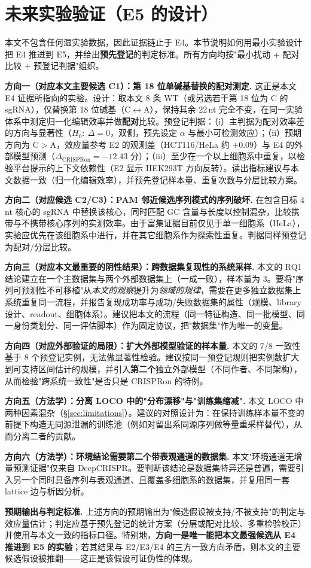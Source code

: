 \section{未来实验验证（E5 的设计）}
\label{sec:future}

本文不包含任何湿实验数据，因此证据链止于 E4。本节说明如何用最小实验设计把 E4 推进到 E5，并给出\textbf{预先登记}的判定标准。所有方向均按"最小扰动 + 配对比较 + 预登记判据"组织。

\textbf{方向一（对应本文主要候选 C1）：第 18 位单碱基替换的配对测定.} 这正是本文 E4 证据所指向的实验。设计：取本文 8 条 WT（或另选若干第 18 位为 C 的 sgRNA），仅替换第 18 位碱基（C$\leftrightarrow$A），保持其余 22\,nt 完全不变，在同一实验体系中测定归一化编辑效率并做\textbf{配对}比较。预登记判据：（i）主判据为配对效率差的方向与显著性（$H_0:\ \Delta=0$，双侧，预先设定 $\alpha$ 与最小可检测效应）；（ii）预期方向为 C$>$A，效应量参考 E2 的观测差（HCT116/HeLa 约 $+0.09$）与 E4 的外部模型预测（$\Delta_{\text{CRISPRon}}=-12.43$ 分）；（iii）至少在一个以上细胞系中重复，以检验平台提示的上下文依赖性（E2 显示 HEK293T 方向反转）。读出指标建议与本文数据一致（归一化编辑效率），并预先登记样本量、重复次数与分层比较方案。

\textbf{方向二（对应候选 C2/C3）：PAM 邻近候选序列模式的序列破坏.} 在包含目标 4\,nt 核心的 sgRNA 中替换该核心，同时匹配 GC 含量与长度以控制混杂，比较携带与不携带核心序列的实测效率。由于富集证据目前仅见于单一细胞系（HeLa），实验应优先在该细胞系中进行，并在其它细胞系作为探索性重复。判据同样预登记为配对/分层比较。

\textbf{方向三（对应本文最重要的阴性结果）：跨数据集复现性的系统采样.} 本文的 RQ1 结论建立在一个主数据集与两个外部数据集上（一成一败），样本量为 3。要将"序列可预测性不可移植"从\emph{本文的观察}提升为\emph{领域的规律}，需要在更多独立数据集上系统重复同一流程，并报告复现成功率与成功/失败数据集的属性（规模、library 设计、readout、细胞体系）。建议把本文的流程（同一特征构造、同一批模型、同一身份类划分、同一评估脚本）作为固定协议，把"数据集"作为唯一的变量。

\textbf{方向四（对应外部验证的局限）：扩大外部模型验证的样本量.} 本文的 7/8 一致性基于 8 个预登记实例，无法做显著性检验。建议按同一预登记规则把实例数扩大到可支持区间估计的规模，并引入\textbf{第二个}独立外部模型（不同作者、不同架构），从而检验"跨系统一致性"是否只是 CRISPRon 的特例。

\textbf{方向五（方法学）：分离 LOCO 中的"分布漂移"与"训练集缩减".} 本文 LOCO 中两种因素混杂（\S\ref{sec:limitations}）。建议的对照设计为：在保持训练样本量不变的前提下构造无同源泄漏的训练池（例如对留出系同源序列做等量重采样替代），从而分离二者的贡献。

\textbf{方向六（方法学）：环境结论需要第二个带表观通道的数据集.} 本文"环境通道无增量预测证据"仅来自 DeepCRISPR。要判断该结论是数据集特异还是普遍，需要引入另一个同时具备序列与表观通道、且覆盖多细胞系的数据集，并复用同一套 lattice 边与析因分析。

\textbf{预期输出与判定标准.} 上述方向的预期输出为"候选假设被支持/不被支持"的判定与效应量估计；判定应基于预先登记的统计方案（分层或配对比较、多重检验校正）并使用与本文一致的指标口径。特别地，\textbf{方向一是唯一能把本文最强候选从 E4 推进到 E5 的实验}；若其结果与 E2/E3/E4 的三方一致方向矛盾，则本文的主要候选假设被推翻——这正是该假设可证伪性的体现。
